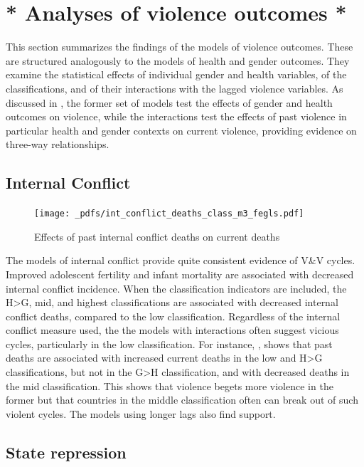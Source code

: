\documentclass[12pt]{article}
\begin{document}
\section{* Analyses of violence outcomes *}
\label{results_violence}

This section summarizes the findings of the models of violence outcomes. These are structured analogously to the models of health and gender outcomes. They examine the statistical effects of individual gender and health variables, of the classifications, and of their interactions with the lagged violence variables. As discussed in , the former set of models test the effects of gender and health outcomes on violence, while the interactions test the effects of past violence in particular health and gender contexts on current violence, providing evidence on three-way relationships.

\subsection{Internal Conflict}

\begin{figure}[!htb]
    \centering
    \caption{Effects of past internal conflict deaths on current deaths}
    \label{int_conflict_deaths}
    \texttt{[image: \_pdfs/int\_conflict\_deaths\_class\_m3\_fegls.pdf]}
\end{figure}

The models of internal conflict provide quite consistent evidence of V\&V cycles. Improved adolescent fertility and infant mortality are associated with decreased internal conflict incidence. When the classification indicators are included, the H>G, mid, and highest classifications are associated with decreased internal conflict deaths, compared to the low classification. Regardless of the internal conflict measure used, the the models with interactions often suggest vicious cycles, particularly in the low classification. For instance, , shows that past deaths are associated with increased current deaths in the low and H>G classifications, but not in the G>H classification, and with decreased deaths in the mid classification. This shows that violence begets more violence in the former but that countries in the middle classification often can break out of such violent cycles. The models using longer lags also find support.

\subsection{State repression}
\end{document}
